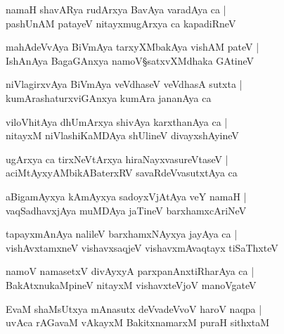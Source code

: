 \begin{shloka}
namaH shavARya rudArxya BavAya varadAya ca |\\
pashUnAM patayeV nitayxmugArxya ca kapadiRneV 
\end{shloka}

\begin{shloka}
mahAdeVvAya BiVmAya tarxyXMbakAya vishAM pateV |\\
IshAnAya BagaGAnxya namoV\S satxvXMdhaka GAtineV 
\end{shloka}

\begin{shloka}
niVlagirxvAya BiVmAya veVdhaseV veVdhasA sutxta |\\
kumArashaturxviGAnxya kumAra jananAya ca 
\end{shloka}

\begin{shloka}
viloVhitAya dhUmArxya shivAya karxthanAya ca |\\
nitayxM niVlashiKaMDAya shUlineV divayxshAyineV 
\end{shloka}

\begin{shloka}
ugArxya ca tirxNeVtArxya hiraNayxvasureVtaseV |\\
aciMtAyxyAMbikABaterxRV savaRdeVvasutxtAya ca 
\end{shloka}

\begin{shloka}
aBigamAyxya kAmAyxya sadoyxVjAtAya veY namaH |\\
vaqSadhavxjAya muMDAya jaTineV barxhamxcAriNeV 
\end{shloka}

\begin{shloka}
tapayxmAnAya nalileV barxhamxNAyxya jayAya ca |\\
vishAvxtamxneV vishavxsaqjeV vishavxmAvaqtayx tiSaThxteV 
\end{shloka}

\begin{shloka}
namoV namasetxV divAyxyA parxpanAnxtiRharAya ca |\\
BakAtxnukaMpineV nitayxM vishavxteVjoV manoVgateV 
\end{shloka}

\begin{shloka}
EvaM shaMsUtxya mAnasutx deVvadeVvoV haroV naqpa |\\
uvAca rAGavaM vAkayxM BakitxnamarxM puraH sithxtaM 
\end{shloka}

